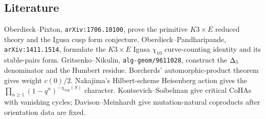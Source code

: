 \subsection*{Literature}

Oberdieck--Pixton, \texttt{arXiv:1706.10100}, prove the primitive
\(K3\times E\) reduced theory and the Igusa cusp form conjecture.
Oberdieck--Pandharipande, \texttt{arXiv:1411.1514}, formulate the
\(K3\times E\) Igusa \(\chi_{10}\) curve-counting identity and its
stable-pairs form.  Gritsenko--Nikulin, \texttt{alg-geom/9611028},
construct the \(\Delta_{5}\) denominator and the Humbert residue.
Borcherds' automorphic-product theorem gives weight \(c(0)/2\).
Nakajima's Hilbert-scheme Heisenberg action gives the
\(\prod_{n\geq 1}(1-q^n)^{-\chi_{\mathrm{top}}(S)}\) character.
Kontsevich--Soibelman give critical CoHAs with vanishing cycles;
Davison--Meinhardt give mutation-natural coproducts after orientation
data are fixed.
